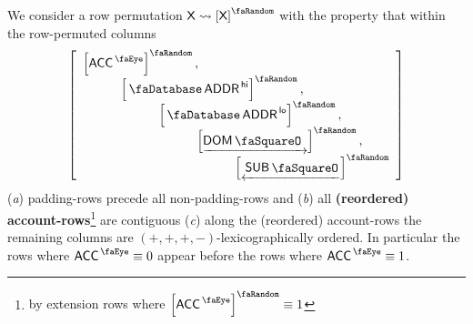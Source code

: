 We consider a row permutation $\col{X}\rightsquigarrow\order{\col{X}}$ with the property that within the row-permuted columns
\[
	\left[\begin{array}{l}
		\order{\peekAccount}, \\
		\quad\quad\quad \order{\accAddress\high}, \\
		\quad\quad\quad \quad\quad\quad \order{\accAddress\low}, \\
		\quad\quad\quad \quad\quad\quad \quad\quad\quad \order{\domStamp}, \\
		\quad\quad\quad \quad\quad\quad \quad\quad\quad \quad\quad\quad\order{\subStamp} \\
	\end{array}\right]
\]
(\emph{a}) padding-rows precede all non-padding-rows and
(\emph{b}) all \textbf{(reordered) account-rows}\footnote{by extension rows where $\order{\peekAccount} \equiv 1$} are contiguous
(\emph{c}) along the (reordered) account-rows the remaining columns are $(+, +, +, -)$-lexicographically ordered.
In particular the rows where $\peekAccount \equiv 0$ appear before the rows where $\peekAccount \equiv 1$.

